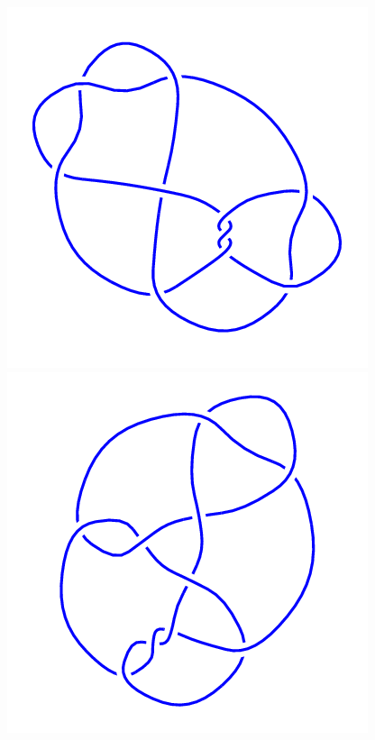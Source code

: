 \begin{figure}[H]
    \begin{minipage}[b]{.18\linewidth}
        \centering
        \includegraphics[width=\linewidth]{../data/10_52.png}
    \end{minipage}
    \begin{minipage}[b]{.18\linewidth}
        \centering
        \includegraphics[width=\linewidth]{../data/10_53.png}

\end{minipage}
\end{figure}
